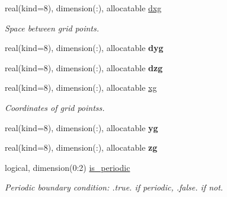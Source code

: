 \textbf{ }\par
\begin{DoxyCompactItemize}
\item 
\mbox{\label{structgeometry_1_1domain_a8c14a8b59fb785d4b2269dc8076da6da}} 
real(kind=8), dimension(\+:), allocatable \hyperlink{structgeometry_1_1domain_a8c14a8b59fb785d4b2269dc8076da6da}{dxg}
\begin{DoxyCompactList}\small\item\em Space between grid points. \end{DoxyCompactList}\item 
\mbox{\label{structgeometry_1_1domain_ace85559dc512416edb86321ab9c114e4}} 
real(kind=8), dimension(\+:), allocatable {\bfseries dyg}
\item 
\mbox{\label{structgeometry_1_1domain_a3fb6344986301deb02c4cae52b0e4cd3}} 
real(kind=8), dimension(\+:), allocatable {\bfseries dzg}
\end{DoxyCompactItemize}

\textbf{ }\par
\begin{DoxyCompactItemize}
\item 
\mbox{\label{structgeometry_1_1domain_ae361f615bcd5fe5d4d8046ad04a32d2b}} 
real(kind=8), dimension(\+:), allocatable \hyperlink{structgeometry_1_1domain_ae361f615bcd5fe5d4d8046ad04a32d2b}{xg}
\begin{DoxyCompactList}\small\item\em Coordinates of grid pointss. \end{DoxyCompactList}\item 
\mbox{\label{structgeometry_1_1domain_a2a98fddcd9b8f316d4a9bd5bd5fac39f}} 
real(kind=8), dimension(\+:), allocatable {\bfseries yg}
\item 
\mbox{\label{structgeometry_1_1domain_aca2383065957f2968b9261eccd000c3c}} 
real(kind=8), dimension(\+:), allocatable {\bfseries zg}
\end{DoxyCompactItemize}

\textbf{ }\par
\begin{DoxyCompactItemize}
\item 
\mbox{\label{structgeometry_1_1domain_a7f5ef8616243a13ec432ec9077ea1d0a}} 
logical, dimension(0\+:2) \hyperlink{structgeometry_1_1domain_a7f5ef8616243a13ec432ec9077ea1d0a}{is\+\_\+periodic}
\begin{DoxyCompactList}\small\item\em Periodic boundary condition\+: .true. if periodic, .false. if not. \end{DoxyCompactList}\end{DoxyCompactItemize}




